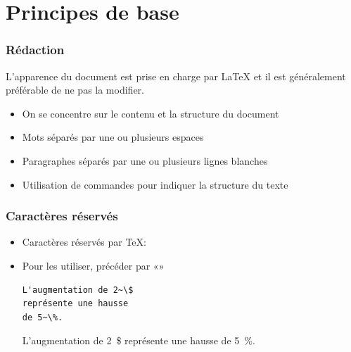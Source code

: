 
\section{Principes de base}

\begin{frame}
  \frametitle{Rédaction}

  L'apparence du document est prise en charge par {\LaTeX} et
  il est généralement préférable de ne pas la modifier.

  \begin{itemize}
  \item On se concentre sur le \alert{contenu} et la \alert{structure} du
    document
  \item Mots séparés par une ou plusieurs \alert{espaces}
  \item Paragraphes séparés par une ou plusieurs \alert{lignes blanches}
  \item Utilisation de \alert{commandes} pour indiquer la structure du texte
  \end{itemize}
\end{frame}

\begin{frame}[fragile=singleslide]
  \frametitle{Caractères réservés}

  \begin{itemize}
  \item Caractères réservés par {\TeX}:
    \begin{quote}
      \code{\#~\$~\&~\string~~\_~\string^~\%~\{~\}}
    \end{quote}
  \item Pour les utiliser, précéder par «\bs»
    \begin{demo}
      \begin{texample}
\begin{lstlisting}
L'augmentation de 2~\$
représente une hausse
de 5~\%.
\end{lstlisting}
        \producing
        L'augmentation de 2~\$ représente une
        hausse de 5~\%.
      \end{texample}
    \end{demo}
  \end{itemize}
\end{frame}

